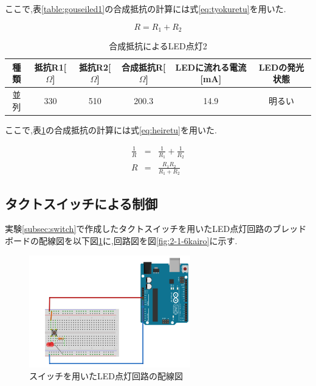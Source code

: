 \documentclass{jarticle}
\begin{document}
ここで,表\ref{table:gouseiled1}の合成抵抗の計算には式\ref{eq:tyokuretu}を用いた.

\begin{equation}
R=R_1+R_2
\label{eq:tyokuretu}
\end{equation}

\begin{table}[H]
\centering
\caption{合成抵抗によるLED点灯2}
\label{table:gouseiled2}
\begin{center}
\begin{tabular}{c|c|c|c|c|c}
\hline \hline
種類 & 抵抗R1[$\Omega$] & 抵抗R2[$\Omega$]&合成抵抗R[$\Omega$]&LEDに流れる電流[mA] &LEDの発光状態\\ \hline
並列 & 330 &510&200.3&14.9&明るい \\ \hline
\end{tabular}
\end{center}
\end{table}

ここで,表\ref{table:gouseiled2}の合成抵抗の計算には式\ref{eq:heiretu}を用いた.

\begin{eqnarray}
\frac{1}{R}&=&\frac{1}{R_1}+\frac{1}{R_2} \nonumber \\
R&=&\frac{R_1R_2}{R_1+R_2}
\label{eq:heiretu}
\end{eqnarray}

\subsection{タクトスイッチによる制御}
実験\ref{subsec:switch}で作成したタクトスイッチを用いたLED点灯回路のブレッドボードの配線図を以下図\ref{fig:2-1-6bread}に,回路図を図\ref{fig:2-1-6kairo}に示す.

\begin{figure}[H]
\begin{center}
\includegraphics[width=7.0cm]{images/kadai2-1-6_ブレッドボード.png}
\caption{スイッチを用いたLED点灯回路の配線図}
\label{fig:2-1-6bread}
\end{center}
\end{figure}
\end{document}
